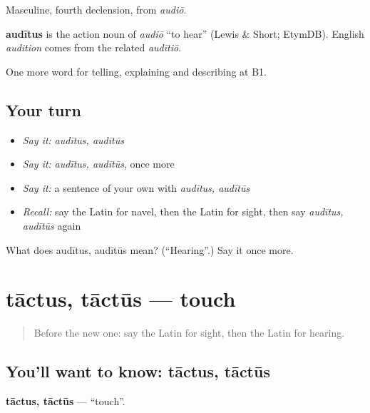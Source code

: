 Masculine, fourth declension, from \emph{audiō}.

\begin{cousinweb}
\textbf{audītus} is the action noun of \emph{audiō} \textquotedblleft{}to hear\textquotedblright{} (Lewis \& Short; EtymDB). English \emph{audition} comes from the related \emph{audītiō}.
\end{cousinweb}

\begin{grammarlens}[title={What you've built}]
One more word for telling, explaining and describing at B1.
\end{grammarlens}

\subsection*{Your turn}
\begin{itemize}
\raggedright
  \item \emph{Say it:} \emph{audītus, audītūs}
  \item \emph{Say it:} \emph{audītus, audītūs}, once more
  \item \emph{Say it:} a sentence of your own with \emph{audītus, audītūs}
  \item \emph{Recall:} say the Latin for navel, then the Latin for sight, then say \emph{audītus, audītūs} again
\end{itemize}

\begin{tcolorbox}[breakable,colback=teal!4,colframe=teal!35!black,title={Before you move on}]
What does audītus, audītūs mean? (\textquotedblleft{}Hearing\textquotedblright{}.) Say it once more.
\end{tcolorbox}
\section[tāctus, tāctūs]{tāctus, tāctūs — touch}

\label{lesson:LA-C519-tactus}



\begin{quote}
Before the new one: say the Latin for sight, then the Latin for hearing.
\end{quote}

\subsection*{You'll want to know: tāctus, tāctūs}
\textbf{tāctus, tāctūs} — \textquotedblleft{}touch\textquotedblright{}.

